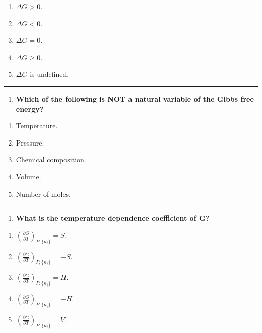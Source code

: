 \documentclass[
  9pt,
]{extbook}
\providecommand{\tightlist}{%
  \setlength{\itemsep}{0pt}\setlength{\parskip}{0pt}}
\theoremstyle{definition}
\theoremstyle{definition}
\theoremstyle{definition}
\theoremstyle{remark}
\begin{document}
\begin{enumerate}
\def\labelenumi{\alph{enumi}.}
\tightlist
\item
  \(\Delta G > 0\).
\item
  \(\Delta G < 0\).
\item
  \(\Delta G = 0\).
\item
  \(\Delta G \geq 0\).
\item
  \(\Delta G\) is undefined.
\end{enumerate}

\begin{center}\rule{0.5\linewidth}{0.5pt}\end{center}

\begin{enumerate}
\def\labelenumi{\arabic{enumi}.}
\setcounter{enumi}{2}
\tightlist
\item
  \textbf{Which of the following is NOT a natural variable of the Gibbs free energy?}
\end{enumerate}

\begin{enumerate}
\def\labelenumi{\alph{enumi}.}
\tightlist
\item
  Temperature.
\item
  Pressure.
\item
  Chemical composition.
\item
  Volume.
\item
  Number of moles.
\end{enumerate}

\begin{center}\rule{0.5\linewidth}{0.5pt}\end{center}

\begin{enumerate}
\def\labelenumi{\arabic{enumi}.}
\setcounter{enumi}{3}
\tightlist
\item
  \textbf{What is the temperature dependence coefficient of G?}
\end{enumerate}

\begin{enumerate}
\def\labelenumi{\alph{enumi}.}
\tightlist
\item
  \(\left(\frac{\partial G}{\partial T}\right)_{P,\{n_i\}} = S\).
\item
  \(\left(\frac{\partial G}{\partial T}\right)_{P,\{n_i\}} = -S\).
\item
  \(\left(\frac{\partial G}{\partial T}\right)_{P,\{n_i\}} = H\).
\item
  \(\left(\frac{\partial G}{\partial T}\right)_{P,\{n_i\}} = -H\).
\item
  \(\left(\frac{\partial G}{\partial T}\right)_{P,\{n_i\}} = V\).
\end{enumerate}
\end{document}
